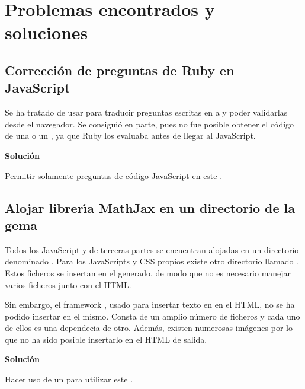 \section{Problemas encontrados y soluciones}
\label{4:sec:1}

\subsection{Correcci\'on de preguntas de Ruby en JavaScript}
\label{subsec:4.1.2}
\bigskip

Se ha tratado de usar \ceis{\ref{apend1:opal}} para traducir preguntas escritas en  a  y poder validarlas desde el navegador.
Se consigui\'o en parte, pues no fue posible obtener el c\'odigo de una \cei{\ref{apend1:lambda}} o un \cei{\ref{apend1:proc}}, ya que Ruby los evaluaba antes de llegar al
JavaScript.
\bigskip

{\normalsize {\bfseries Soluci\'on}}
\bigskip

Permitir solamente preguntas de c\'odigo JavaScript en este .

\subsection{Alojar librer\'{\i}a MathJax en un directorio de la gema}
\label{subsec:4.1.3}
\bigskip

Todos los JavaScript y  de terceras partes se encuentran alojadas en un directorio denominado . Para los JavaScripts y CSS
propios existe otro directorio llamado . Estos ficheros se insertan en el  generado, de modo que no es necesario manejar varios
ficheros junto con el HTML. 

Sin embargo, el framework , usado para insertar texto en  en el HTML, no se ha podido insertar en el mismo. Consta de un
amplio n\'umero de ficheros y cada uno de ellos es una dependecia de otro. Adem\'as, existen numerosas im\'agenes por lo que no ha sido posible insertarlo
en el HTML de salida.
\bigskip

{\normalsize {\bfseries Soluci\'on}}
\bigskip

Hacer uso de un  para utilizar este .
